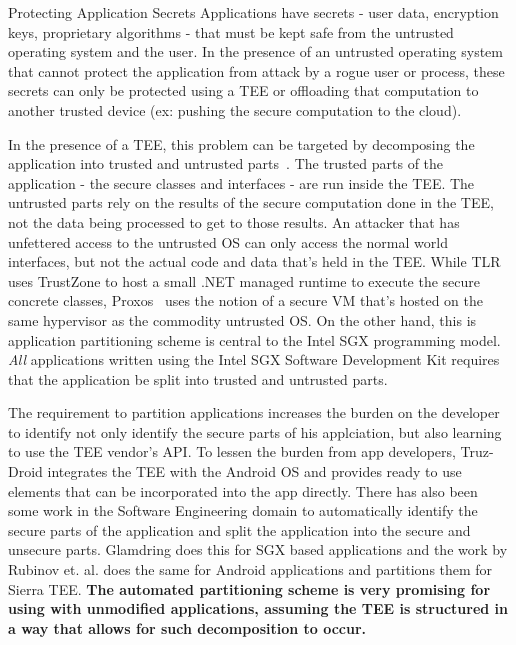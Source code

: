 \begin{subsection}{Protecting Application Secrets}
Applications have secrets - user data, encryption keys, proprietary
algorithms - that must be kept safe from the untrusted operating system and
the user. In the presence of an untrusted operating system that cannot
protect the application from attack by a rogue user or process, these
secrets can only be protected using a TEE or offloading that computation to
another trusted device (ex: pushing the secure computation to the cloud). 

In the presence of a TEE, this problem can be targeted by decomposing the
application into trusted and untrusted parts~\cite{TLR,Proxos}. The trusted
parts of the application - the secure classes and interfaces - are run
inside the TEE. The untrusted  parts rely on the results of the secure
computation done in the TEE, not the data being processed to get to those
results. An attacker that has unfettered access to the untrusted OS can only
access the normal world interfaces, but not the actual code and data that's
held in the TEE. While TLR~\cite{TLR} uses TrustZone to host a small .NET
managed runtime to execute the secure concrete classes, Proxos~\cite{Proxos}
uses the notion of a secure VM that's hosted on the same hypervisor as the
commodity untrusted OS. On the other hand, this is application partitioning
scheme is central to the Intel SGX programming model. \emph{All}
applications written using the Intel SGX Software Development Kit requires
that the application be split into trusted and untrusted parts.

The requirement to partition applications increases the burden on the
developer to identify not only identify the secure parts of his applciation,
but also learning to use the TEE vendor's API. To lessen the burden from app
developers, Truz-Droid\cite{ying18truzdroid} integrates the TEE with the
Android OS and provides ready to use elements that can be incorporated into
the app directly. There has also been some work in the Software Engineering
domain to automatically identify the secure parts of the application and
split the application into the secure and unsecure parts. Glamdring
\cite{lind2017glamdring} does this for SGX based applications and the work
by Rubinov et. al.\cite{rubinov2016automated} does the same for Android
applications and partitions them for Sierra TEE\cite{sierratee}. \textbf{The
automated partitioning scheme is very promising for using with unmodified
applications, assuming the TEE is structured in a way that allows for such
decomposition to occur.}


\end{subsection}
